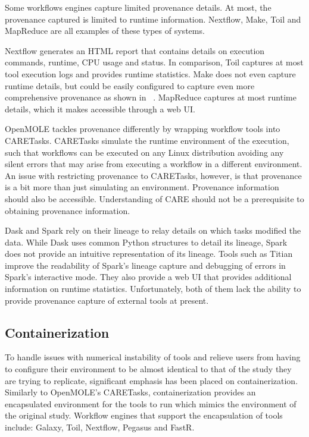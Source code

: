             Some workflows engines capture limited provenance details. At most,
            the provenance captured is limited to runtime information. Nextflow,
            Make, Toil and MapReduce are all examples of these types of systems.

            Nextflow generates an HTML report that contains details on execution
            commands, runtime, CPU usage and status. In comparison, Toil
            captures at most tool execution logs and provides runtime
            statistics. Make does not even capture runtime details, but could be
            easily configured to capture even more comprehensive provenance as
            shown in ~\cite{10.3389/fninf.2016.00002}. MapReduce captures at
            most runtime details, which it makes accessible through a web UI.

            OpenMOLE tackles provenance differently by wrapping workflow tools
            into CARETasks. CARETasks simulate the runtime environment of the
            execution, such that workflows can be executed on any Linux
            distribution avoiding any silent errors that may arise from
            executing a workflow in a different environment. An issue with
            restricting provenance to CARETasks, however, is that provenance is
            a bit more than just simulating an environment. Provenance
            information should also be accessible. Understanding of CARE should
            not be a prerequisite to obtaining provenance information.
                     
            Dask and Spark rely on their lineage to relay details on which tasks
            modified the data. While Dask uses common Python structures to
            detail its lineage, Spark does not provide an intuitive
            representation of its lineage. Tools such as
            Titian~\cite{interlandi2018adding} improve the readability of
            Spark's lineage capture and  debugging of errors in Spark's
            interactive mode. They also provide a web UI that provides
            additional information on runtime statistics. Unfortunately, both of
            them lack the ability to provide provenance capture of external
            tools at present.

        \subsection{Containerization}\label{repcont}

            To handle issues with numerical instability of tools and relieve
            users from having to configure their environment to be almost
            identical to that of the study they are trying to replicate,
            significant emphasis has been placed on containerization. Similarly
            to OpenMOLE's CARETasks, containerization provides an encapsulated
            environment for the tools to run which mimics the environment of the
            original study. Workflow engines that support the encapsulation of
            tools include: Galaxy, Toil, Nextflow, Pegasus and FastR. 

